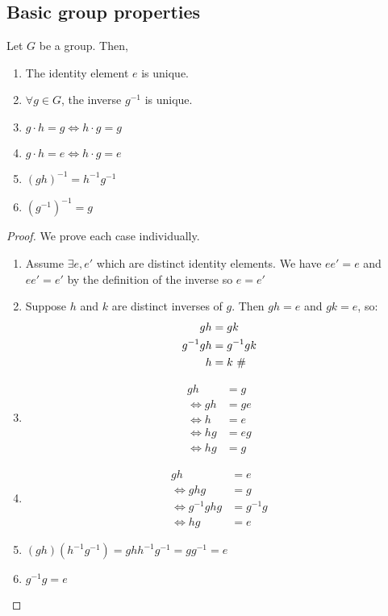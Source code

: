 \subsection{Basic group properties}
\begin{proposition}
	Let \(G\) be a group.
	Then,
	\begin{enumerate}
		\item The identity element \(e\) is unique.
		\item \(\forall g \in G\), the inverse \(g^{-1}\) is unique.
		\item \(g \cdot h = g \iff h \cdot g = g\)
		\item \(g \cdot h = e \iff h \cdot g = e\)
		\item \((gh)^{-1} = h^{-1} g^{-1}\)
		\item \((g^{-1})^{-1} = g\)
	\end{enumerate}
\end{proposition}
\begin{proof}
	We prove each case individually.
	\begin{enumerate}
		\item Assume \(\exists e, e'\) which are distinct identity elements.
		      We have \(e e' = e\) and \(e e' = e'\) by the definition of the inverse so \(e = e'\) \contradiction{}
		\item Suppose \(h\) and \(k\) are distinct inverses of \(g\).
		      Then \(gh = e\) and \(gk = e\), so:
		      \begin{align*}
			      gh        & = gk                       \\
			      g^{-1} gh & = g^{-1} gk                \\
			      h         & = k \text{ \(\#\)}
		      \end{align*}
		\item \begin{align*}
			      gh      & = g  \\
			      \iff gh & = ge \\
			      \iff h  & = e  \\
			      \iff hg & = eg \\
			      \iff hg & = g
		      \end{align*}
		\item \begin{align*}
			      gh              & = e       \\
			      \iff ghg        & = g       \\
			      \iff g^{-1} ghg & = g^{-1}g \\
			      \iff hg         & = e
		      \end{align*}
		\item \((gh) (h^{-1}g^{-1}) = g h h^{-1} g^{-1} = g g^{-1} = e\)
		\item \(g^{-1} g = e\)
	\end{enumerate}
\end{proof}

